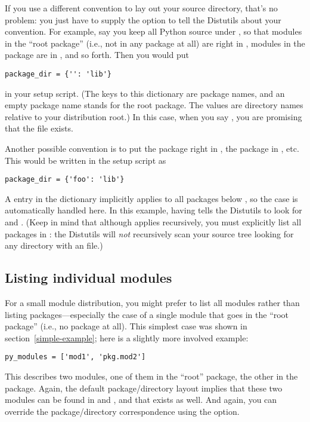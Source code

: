 \documentclass{howto}
\begin{document}
If you use a different convention to lay out your source directory,
that's no problem: you just have to supply the 
option to tell the Distutils about your convention.  For example, say
you keep all Python source under , so that modules in the
``root package'' (i.e., not in any package at all) are right in
, modules in the  package are in ,
and so forth.  Then you would put
\begin{verbatim}
package_dir = {'': 'lib'}
\end{verbatim}
in your setup script.  (The keys to this dictionary are package names,
and an empty package name stands for the root package.  The values are
directory names relative to your distribution root.)  In this case, when
you say , you are promising that the file
 exists.

Another possible convention is to put the  package right in 
, the  package in , etc.  This
would be written in the setup script as
\begin{verbatim}
package_dir = {'foo': 'lib'}
\end{verbatim}
A  entry in the 
dictionary implicitly applies to all packages below , so
the  case is automatically handled here.  In this
example, having  tells the Distutils
to look for  and
.  (Keep in mind that although
 applies recursively, you must explicitly list all
packages in : the Distutils will \emph{not} recursively
scan your source tree looking for any directory with an
 file.)


\subsection{Listing individual modules}
\label{listing-modules}

For a small module distribution, you might prefer to list all modules
rather than listing packages---especially the case of a single module
that goes in the ``root package'' (i.e., no package at all).  This
simplest case was shown in section~\ref{simple-example}; here is a
slightly more involved example:
\begin{verbatim}
py_modules = ['mod1', 'pkg.mod2']
\end{verbatim}
This describes two modules, one of them in the ``root'' package, the
other in the  package.  Again, the default package/directory
layout implies that these two modules can be found in  and
, and that  exists as well.
And again, you can override the package/directory correspondence using
the  option.
\end{document}
